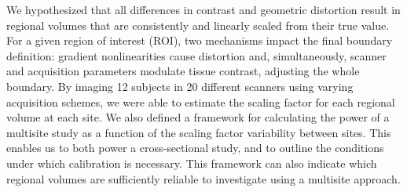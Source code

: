 We hypothesized that all differences in contrast and geometric distortion result in regional volumes that are consistently and linearly scaled from their true value. For a given region of interest (ROI), two mechanisms impact the final boundary definition: gradient nonlinearities cause distortion and, simultaneously, scanner and acquisition parameters modulate tissue contrast, adjusting the whole boundary. By imaging 12 subjects in 20 different scanners using varying acquisition schemes, we were able to estimate the scaling factor for each regional volume at each site. We also defined a framework for calculating the power of a multisite study as a function of the scaling factor variability between sites. This enables us to both power a cross-sectional study, and to outline the conditions under which calibration is necessary. This framework can also indicate which regional volumes are sufficiently reliable to investigate using a multisite approach.